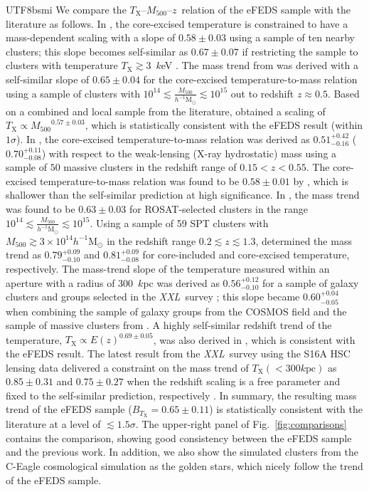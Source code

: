 \documentclass[longauth]{aa}
\newcommand{\Msunh}{\ensuremath{h^{-1}\mathrm{M}_{\odot}}}
\newcommand{\Mfiveoo}{\ensuremath{M_{500}}}
\newcommand{\redshift}{\ensuremath{z}}
\newcommand{\XXL}{\emph{XXL}}
\newcommand{\Ez}{\ensuremath{E(z)}}
\newcommand{\Tx}{\ensuremath{T_{\mathrm{X}}}}
\newcommand{\Bt}{\ensuremath{B_{T_{\mathrm{X}}}}}
\newcommand{\ansBt}{\ensuremath{ 0.65\pm 0.11 }}
\begin{document}
\begin{CJK*}{UTF8}{bsmi}
We compare the \Tx--\Mfiveoo--\redshift\ relation of the eFEDS sample with the literature as follows.
In \cite{arnaud07}, the core-excised temperature is constrained to have a mass-dependent scaling with a slope of $0.58\pm0.03$ using a sample of ten nearby clusters; this slope becomes self-similar as $0.67\pm0.07$ if restricting the sample to clusters with temperature $\Tx\gtrsim3$~$k$eV \citep{arnaud05}. 
The mass trend from \cite{vikhlinin09a} was derived with a self-similar slope of $0.65\pm0.04$ for the core-excised temperature-to-mass relation using a sample of clusters with $10^{14}\lesssim\frac{\Mfiveoo}{\Msunh}\lesssim10^{15}$ out to redshift $\redshift\approx0.5$.
Based on a combined and local sample from the literature, \cite{reichert11} obtained a scaling of $\Tx\propto{\Mfiveoo}^{0.57\pm0.03}$, which is statistically consistent with the eFEDS result (within $1\sigma$).
In \cite{mahdavi13}, the core-excised temperature-to-mass relation was derived as $0.51^{+0.42}_{-0.16}$ ($0.70^{+0.11}_{-0.08}$) with respect to the weak-lensing (X-ray hydrostatic) mass using a sample of $50$ massive clusters in the redshift range of $0.15<\redshift<0.55$.
The core-excised temperature-to-mass relation was found to be $0.58\pm0.01$ by \cite{lovisari15}, which is shallower than the self-similar prediction at high significance.
In \cite{mantz16b}, the mass trend was found to be $0.63\pm0.03$ for ROSAT-selected clusters in the range $10^{14}\lesssim\frac{\Mfiveoo}{\Msunh}\lesssim10^{15}$.
Using a sample of 59 SPT clusters with $\Mfiveoo\gtrsim3\times10^{14}\Msunh$ in the redshift range $0.2\lesssim\redshift\lesssim1.3$, \cite{bulbul19} determined the mass trend as $0.79^{+0.09}_{-0.10}$ and $0.81^{+0.09}_{-0.08}$ for core-included and core-excised temperature, respectively.
The mass-trend slope of the temperature measured within an aperture with a radius of $300$~$k$pc was derived as $0.56^{+0.12}_{-0.10}$ for a sample of galaxy clusters and groups selected in the \XXL\ survey \citep{lieu16,peirre16}; this slope became $0.60^{+0.04}_{-0.05}$ when combining the sample of galaxy groups from the COSMOS field \citep{kettula13} and the sample of massive clusters from \cite{mahdavi13}.
A highly self-similar redshift trend of the temperature, $\Tx\propto{\Ez}^{0.69\pm0.05}$, was also derived in \cite{reichert11}, which is consistent with the eFEDS result.
The latest result from the \XXL\ survey using the S16A HSC lensing data delivered a constraint on the mass trend of $\Tx(<300k\mathrm{pc})$ as $0.85\pm0.31$ and $0.75\pm0.27$ when the redshift scaling is a free parameter and fixed to the self-similar prediction, respectively \citep{umetsu20}.
In summary, the resulting mass trend of the eFEDS sample ($\Bt = \ansBt$) is statistically consistent with the literature at a level of $\lesssim1.5\sigma$.
The upper-right panel of Fig.~\ref{fig:comparisons} contains the comparison, showing good consistency between the eFEDS sample and the previous work.
In addition, we also show the simulated clusters from the C-Eagle cosmological simulation \citep{barnes17} as the golden stars, which nicely follow the trend of the eFEDS sample.



\end{CJK*}
\end{document}
